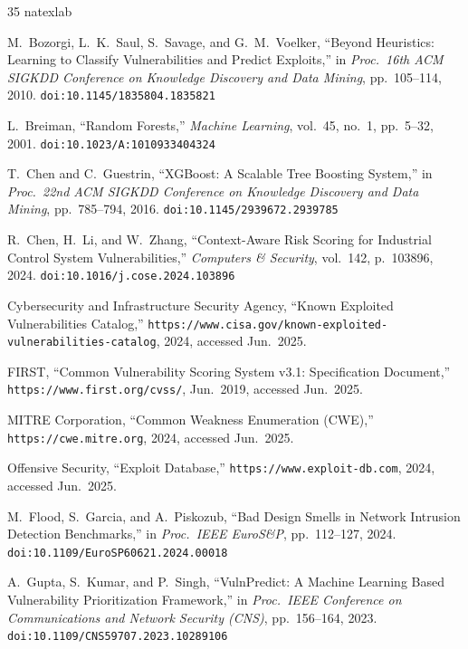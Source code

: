 \documentclass[review,12pt]{elsarticle}
\providecommand{\doi}[1]{\href{https://doi.org/#1}{\texttt{doi:#1}}}
\begin{document}
\begin{thebibliography}{35}
\expandafter\ifx\csname natexlab\endcsname\relax\def\natexlab#1{#1}\fi
\providecommand{\url}[1]{\texttt{#1}}
\providecommand{\href}[2]{#2}


M.~Bozorgi, L.~K.~Saul, S.~Savage, and G.~M.~Voelker,
``Beyond Heuristics: Learning to Classify Vulnerabilities and Predict Exploits,''
in \emph{Proc.\ 16th ACM SIGKDD Conference on Knowledge Discovery and Data Mining},
pp.~105--114, 2010.
\doi{10.1145/1835804.1835821}

L.~Breiman,
``Random Forests,''
\emph{Machine Learning}, vol.~45, no.~1, pp.~5--32, 2001.
\doi{10.1023/A:1010933404324}

T.~Chen and C.~Guestrin,
``XGBoost: A Scalable Tree Boosting System,''
in \emph{Proc.\ 22nd ACM SIGKDD Conference on Knowledge Discovery and Data Mining},
pp.~785--794, 2016.
\doi{10.1145/2939672.2939785}

R.~Chen, H.~Li, and W.~Zhang,
``Context-Aware Risk Scoring for Industrial Control System Vulnerabilities,''
\emph{Computers \& Security}, vol.~142, p.~103896, 2024.
\doi{10.1016/j.cose.2024.103896}

Cybersecurity and Infrastructure Security Agency,
``Known Exploited Vulnerabilities Catalog,''
\url{https://www.cisa.gov/known-exploited-vulnerabilities-catalog},
2024, accessed Jun.\ 2025.

FIRST,
``Common Vulnerability Scoring System v3.1: Specification Document,''
\url{https://www.first.org/cvss/},
Jun.\ 2019, accessed Jun.\ 2025.

MITRE Corporation,
``Common Weakness Enumeration (CWE),''
\url{https://cwe.mitre.org},
2024, accessed Jun.\ 2025.

Offensive Security,
``Exploit Database,''
\url{https://www.exploit-db.com},
2024, accessed Jun.\ 2025.

M.~Flood, S.~Garcia, and A.~Piskozub,
``Bad Design Smells in Network Intrusion Detection Benchmarks,''
in \emph{Proc.\ IEEE EuroS\&P}, pp.~112--127, 2024.
\doi{10.1109/EuroSP60621.2024.00018}

A.~Gupta, S.~Kumar, and P.~Singh,
``VulnPredict: A Machine Learning Based Vulnerability Prioritization Framework,''
in \emph{Proc.\ IEEE Conference on Communications and Network Security (CNS)},
pp.~156--164, 2023.
\doi{10.1109/CNS59707.2023.10289106}


\end{thebibliography}
\end{document}
